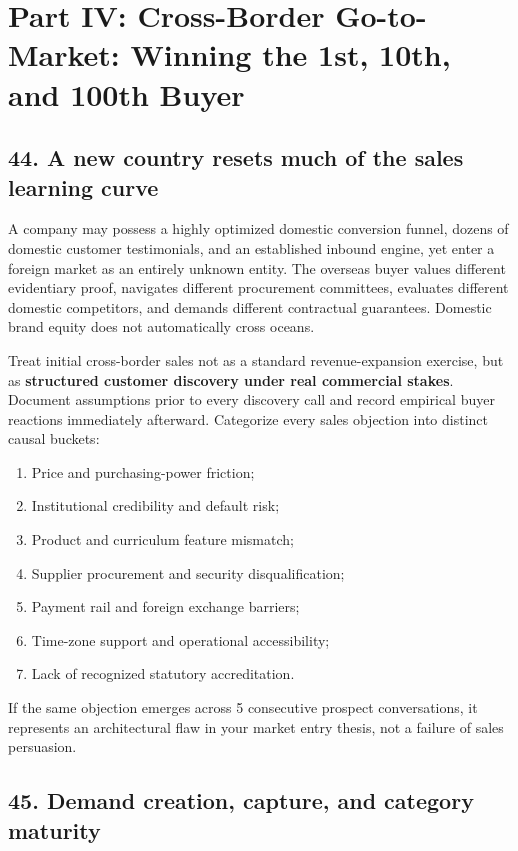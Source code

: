 \section{Part IV: Cross-Border Go-to-Market: Winning the 1st, 10th, and 100th Buyer}

\subsection{44. A new country resets much of the sales learning curve}

A company may possess a highly optimized domestic conversion funnel, dozens of domestic customer testimonials, and an established inbound engine, yet enter a foreign market as an entirely unknown entity. The overseas buyer values different evidentiary proof, navigates different procurement committees, evaluates different domestic competitors, and demands different contractual guarantees. Domestic brand equity does not automatically cross oceans.

Treat initial cross-border sales not as a standard revenue-expansion exercise, but as \textbf{structured customer discovery under real commercial stakes}. Document assumptions prior to every discovery call and record empirical buyer reactions immediately afterward. Categorize every sales objection into distinct causal buckets:
\begin{enumerate}
    \item Price and purchasing-power friction;
    \item Institutional credibility and default risk;
    \item Product and curriculum feature mismatch;
    \item Supplier procurement and security disqualification;
    \item Payment rail and foreign exchange barriers;
    \item Time-zone support and operational accessibility;
    \item Lack of recognized statutory accreditation.
\end{enumerate}
If the same objection emerges across 5 consecutive prospect conversations, it represents an architectural flaw in your market entry thesis, not a failure of sales persuasion.

\subsection{45. Demand creation, capture, and category maturity}

